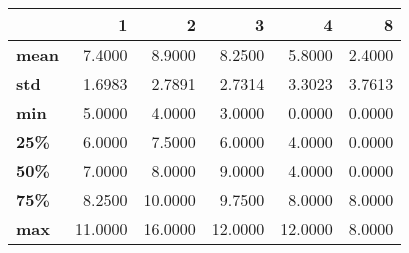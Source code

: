 \begin{tabular}{lrrrrr}
\toprule
{} &        1 &        2 &        3 &        4 &       8 \\
\midrule
\textbf{mean} &   7.4000 &   8.9000 &   8.2500 &   5.8000 &  2.4000 \\
\textbf{std } &   1.6983 &   2.7891 &   2.7314 &   3.3023 &  3.7613 \\
\textbf{min } &   5.0000 &   4.0000 &   3.0000 &   0.0000 &  0.0000 \\
\textbf{25\% } &   6.0000 &   7.5000 &   6.0000 &   4.0000 &  0.0000 \\
\textbf{50\% } &   7.0000 &   8.0000 &   9.0000 &   4.0000 &  0.0000 \\
\textbf{75\% } &   8.2500 &  10.0000 &   9.7500 &   8.0000 &  8.0000 \\
\textbf{max } &  11.0000 &  16.0000 &  12.0000 &  12.0000 &  8.0000 \\
\bottomrule
\end{tabular}
